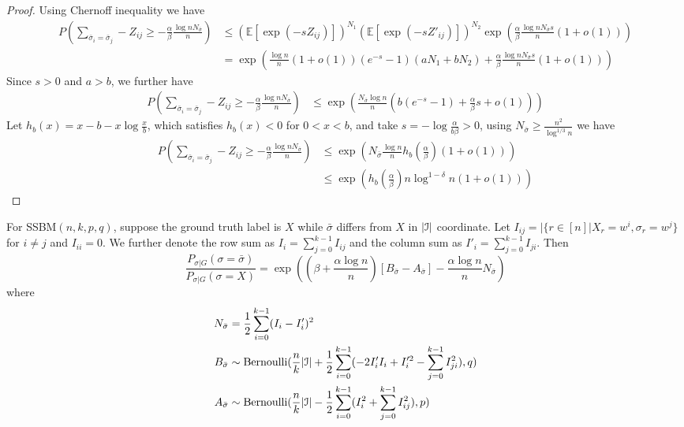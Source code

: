 \documentclass{article}
\begin{document}
\begin{proof}
	Using Chernoff inequality we have
	\begin{align*}
	P(\sum_{ \bar{\sigma}_i  = \bar{\sigma}_j } -Z_{ij} \geq -\frac{\alpha}{\beta}\frac{\log n N_{\bar{\sigma}}}{n})&
	\leq (\mathbb{E}[\exp(-s Z_{ij})])^{N_1} (\mathbb{E}[\exp(-s Z'_{ij})])^{N_2} \exp(\frac{\alpha}{\beta} \frac{\log n N_{\bar{\sigma}} s}{n}(1+o(1))) \\
	&= \exp( \frac{\log n}{n}(1+o(1))(e^{-s}-1)(aN_1 + bN_2)+\frac{\alpha}{\beta} \frac{\log n N_{\bar{\sigma}} s}{n}(1+o(1)))
	\end{align*}
	Since $s > 0$ and $a>b$, we further have
	\begin{align*}
	P(\sum_{ \bar{\sigma}_i  = \bar{\sigma}_j } -Z_{ij} \geq -\frac{\alpha}{\beta}\frac{\log n N_{\bar{\sigma}}}{n})
	& \leq \exp( \frac{N_{\bar{\sigma}}\log n }{n}(b(e^{-s}-1)+ \frac{\alpha}{\beta}s + o(1))) 
	\end{align*}
	Let $h_b(x) = x - b -x\log \frac{x}{b}$, which satisfies $h_b(x) < 0$ for $0<x<b$,
	and take $s=-\log\frac{\alpha}{b\beta} > 0$, using 
	$N_{\bar{\sigma}} \geq \frac{n^2}{\log^{1/3} n}$ we have
	\begin{align*}
	P(\sum_{ \bar{\sigma}_i  = \bar{\sigma}_j } -Z_{ij} \geq -\frac{\alpha}{\beta}\frac{\log n N_{\bar{\sigma}}}{n})&\leq \exp( N_{\bar{\sigma}} \frac{\log n}{n} h_b(\frac{\alpha}{\beta})(1+o(1))) \\
	& \leq \exp (h_b(\frac{\alpha}{\beta}) n \log^{1-\delta} n (1+o(1)))
	\end{align*}
\end{proof}
\begin{lemma}\label{lem:minus}
	For SSBM$(n,k,p,q)$, suppose the ground truth label is $X$ while $\bar{\sigma}$ differs from $X$ in $|\mathcal{I}|$ coordinate.
	Let $I_{ij} = |\{r\in [n] | X_r = w^i, \sigma_r = w^j \}$ for $i\neq j$ and $I_{ii} = 0$. We further denote the row sum as $I_i = \sum_{j=0}^{k-1} I_{ij}$ and
	the column sum as $I'_i = \sum_{j=0}^{k-1} I_{ji}$.
	Then
	\begin{equation}\label{eq:general_expansion}
\frac{P_{\sigma|G}(\sigma=\bar{\sigma})}{P_{\sigma|G}(\sigma=X)} = \exp((\beta + \frac{\alpha \log n}{n})[B_{\bar{\sigma}} - A_{\bar{\sigma}}] - \frac{\alpha \log n}{n} N_{\bar{\sigma}})
\end{equation}
	where 
	\begin{align}
	N_{\bar{\sigma}} &= \frac{1}{2}\sum_{i=0}^{k-1} (I_i - I_i')^2 \label{eq:N_w} \\
	B_{\bar{\sigma}} & \sim \textrm{Bernoulli}(\frac{n}{k}|\mathcal{I}| + \frac{1}{2}\sum_{i=0}^{k-1}  (-2 I'_i I_i  + I'^2_i - \sum_{j=0}^{k-1} I^2_{ji}) , q)\\
	A_{\bar{\sigma}} & \sim \textrm{Bernoulli}(\frac{n}{k}|\mathcal{I}| - \frac{1}{2}\sum_{i=0}^{k-1}  (I^2_i + \sum_{j=0}^{k-1} I^2_{ij}), p) \label{eq:A_w}
	\end{align}
\end{lemma}
\end{document}
